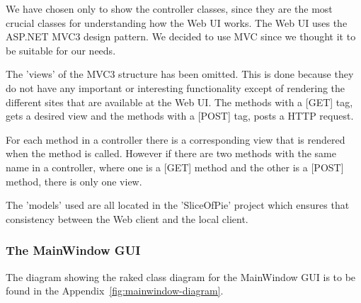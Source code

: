 We have chosen only to show the controller classes, since they are the most crucial classes for understanding how the Web UI works. The Web UI uses
the ASP.NET MVC3 design pattern. We decided to use MVC since we thought it to be suitable for our needs. 

The 'views' of the MVC3 structure has been omitted. This is done because they do not have any important or interesting functionality except of rendering
the different sites that are available at the Web UI. The methods with a [GET] tag, gets a desired view and the methods with a [POST] tag, posts a HTTP request.

For each method in a controller there is a corresponding view that is rendered when the method is called. However if there are two methods with the same 
name in a controller, where one is a [GET] method and the other is a [POST] method, there is only one view.

The 'models' used are all located in the 'SliceOfPie' project which ensures that consistency between the Web client and the local client.

\subsubsection{The MainWindow GUI}

The diagram showing the raked class diagram for the MainWindow GUI is to be found in the Appendix~\ref{fig:mainwindow-diagram}.
